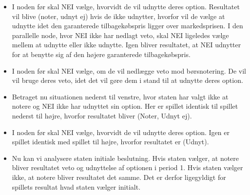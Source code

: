 \documentclass{article}
\begin{document}
\begin{appendices}
\begin{itemize}
		\item I noden før skal NEI vælge, hvorvidt de vil udnytte deres option. Resultatet vil blive (noter, udnyt ej) hvis de ikke udnytter, hvorfor vil de vælge at udnytte idet den garanterede tilbagekøbspris ligger over markedsprisen. I den parallelle node, hvor NEI ikke har nedlagt veto, skal NEI ligeledes vælge mellem at udnytte eller ikke udnytte. Igen bliver resultatet, at NEI udnytter for at benytte sig af den højere garanterede tilbagekøbspris.
		
		\item I noden før skal NEI vælge, om de vil nedlægge veto mod børsnotering. De vil vil bruge deres veto, idet det vil gøre dem i stand til at udnytte deres option.
		
			\item Betraget nu situationen nederst til venstre, hvor staten har valgt ikke at notere og NEI ikke har udnyttet sin option. Her er spillet identisk til spillet nederst til højre, hvorfor resultatet bliver (Noter, Udnyt ej).
		
			\item I noden før skal NEI vælge, hvorvidt de vil udnytte deres option. Igen er spillet identisk med spillet til højre, hvorfor resultatet er (Udnyt). 
		
			\item Nu kan vi analysere staten initiale beslutning. Hvis staten vælger, at notere bliver resultatet veto og udnyttelse af optionen i period 1. Hvis staten vælger ikke, at notere bliver resultatet det samme. Det er derfor ligegyldigt for spillets resultat hvad staten vælger initialt. 
			
\end{itemize}






\end{appendices}
\end{document}
